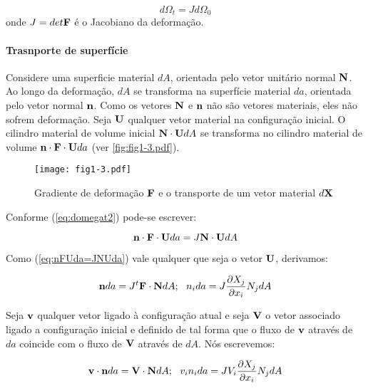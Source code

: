 \documentclass[
	11pt, %
	fleqn, %
	a4paper, %
]{LegrandOrangeBook}
\begin{document}
\begin{equation}
	\label{eq:domegat2}	
	d\Omega_t = Jd\Omega_0
\end{equation}
onde $J=det{\textbf{F}}$ é o Jacobiano da deformação.

\paragraph{Trasnporte de superfície} Considere uma superficie material $dA$, orientada pelo vetor unitário normal $\textbf{N}$. Ao longo da deformação, $dA$ se transforma na superfície material $da$, orientada pelo vetor normal $\textbf{n}$. Como os vetores $\textbf{N}$ e $\textbf{n}$ não são vetores materiais, eles não sofrem deformação. Seja $\textbf{U}$ qualquer vetor material na configuração inicial. O cilindro material de volume inicial $\textbf{N} \cdot \textbf{U} dA$ se transforma no cilindro material de volume $\textbf{n} \cdot \textbf{F} \cdot \textbf{U} da$ (ver \autoref{fig:fig1-3.pdf}). 

\begin{figure}[H] %
	\centering %
	\texttt{[image: fig1-3.pdf]} %
	\caption{Gradiente de deformação $\textbf{F}$ e o transporte de um vetor material $d\textbf{X}$}
	\label{fig:fig1-3.pdf} %
\end{figure}


Conforme (\ref{eq:domegat2}) pode-se escrever:

\begin{equation}
	\label{eq:nFUda=JNUda}	
	\textbf{n} \cdot \textbf{F} \cdot \textbf{U} da = J \textbf{N} \cdot \textbf{U} dA
\end{equation}

Como (\ref{eq:nFUda=JNUda}) vale qualquer que seja o vetor $\textbf{U}$, derivamos:

\begin{equation}
	\label{eq:nda=JFNdA}	
	\textbf{n} da = J {}^t\textbf{F} \cdot \textbf{N} dA; ~~ n_ida = J \dfrac{\partial X_j}{\partial x_i}N_jdA
\end{equation}

Seja $\textbf{v}$ qualquer vetor ligado à configuração atual e seja $\textbf{V}$ o vetor associado ligado a configuração inicial e definido de tal forma que o fluxo de $\textbf{v}$ através de $da$ coincide com o fluxo de $\textbf{V}$ através de $dA$. Nós escrevemos:

\begin{equation}
	\label{eq:vnda=VNdA}	
	\textbf{v} \cdot \textbf{n} da = \textbf{V} \cdot \textbf{N} dA;~~ v_in_ida = JV_i\dfrac{\partial X_j}{\partial x_i}N_jdA
\end{equation}
\end{document}
